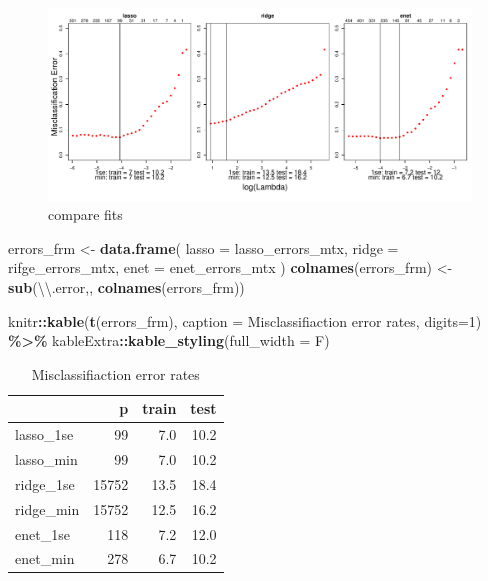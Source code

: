 \documentclass[
]{book}
\newenvironment{Shaded}{\begin{snugshade}}{\end{snugshade}}
\newcommand{\CharTok}[1]{\textcolor[rgb]{0.31,0.60,0.02}{#1}}
\newcommand{\DataTypeTok}[1]{\textcolor[rgb]{0.13,0.29,0.53}{#1}}
\newcommand{\DecValTok}[1]{\textcolor[rgb]{0.00,0.00,0.81}{#1}}
\newcommand{\KeywordTok}[1]{\textcolor[rgb]{0.13,0.29,0.53}{\textbf{#1}}}
\newcommand{\NormalTok}[1]{#1}
\newcommand{\OperatorTok}[1]{\textcolor[rgb]{0.81,0.36,0.00}{\textbf{#1}}}
\newcommand{\StringTok}[1]{\textcolor[rgb]{0.31,0.60,0.02}{#1}}
\begin{document}
\begin{figure}
\centering
\includegraphics{Static/figures/lookFits-1.pdf}
\caption{\label{fig:lookFits}compare fits}
\end{figure}

\begin{Shaded}
\begin{Highlighting}[]
\NormalTok{errors\_frm <{-}}\StringTok{ }\KeywordTok{data.frame}\NormalTok{(}
  \DataTypeTok{lasso =}\NormalTok{ lasso\_errors\_mtx, }\DataTypeTok{ridge =}\NormalTok{ rifge\_errors\_mtx, }\DataTypeTok{enet =}\NormalTok{ enet\_errors\_mtx}
\NormalTok{)}
\KeywordTok{colnames}\NormalTok{(errors\_frm) <{-}}\StringTok{ }\KeywordTok{sub}\NormalTok{(}\StringTok{\textquotesingle{}}\CharTok{\textbackslash{}\textbackslash{}}\StringTok{.error\textquotesingle{}}\NormalTok{,}\StringTok{\textquotesingle{}\textquotesingle{}}\NormalTok{, }\KeywordTok{colnames}\NormalTok{(errors\_frm))}

\NormalTok{knitr}\OperatorTok{::}\KeywordTok{kable}\NormalTok{(}\KeywordTok{t}\NormalTok{(errors\_frm),}
 \DataTypeTok{caption =} \StringTok{\textquotesingle{}Misclassifiaction error rates\textquotesingle{}}\NormalTok{,}
 \DataTypeTok{digits=}\DecValTok{1}\NormalTok{) }\OperatorTok{\%>\%}\StringTok{ }
\StringTok{  }\NormalTok{kableExtra}\OperatorTok{::}\KeywordTok{kable\_styling}\NormalTok{(}\DataTypeTok{full\_width =}\NormalTok{ F)}
\end{Highlighting}
\end{Shaded}

\begin{table}

\caption{\label{tab:printErrors}Misclassifiaction error rates}
\centering
\begin{tabular}[t]{l|r|r|r}
\hline
  & p & train & test\\
\hline
lasso\_1se & 99 & 7.0 & 10.2\\
\hline
lasso\_min & 99 & 7.0 & 10.2\\
\hline
ridge\_1se & 15752 & 13.5 & 18.4\\
\hline
ridge\_min & 15752 & 12.5 & 16.2\\
\hline
enet\_1se & 118 & 7.2 & 12.0\\
\hline
enet\_min & 278 & 6.7 & 10.2\\
\hline
\end{tabular}
\end{table}
\end{document}
